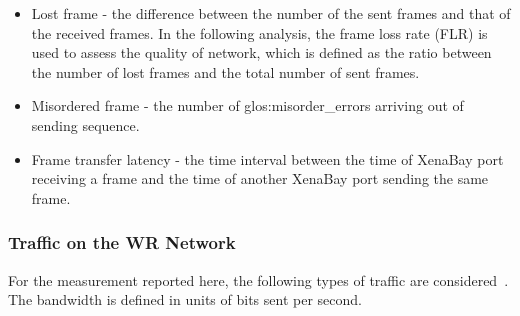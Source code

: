 \begin{itemize}
    \item Lost frame - the difference between the number of the sent frames and that of the received frames. In the following analysis, the frame loss rate (\gls{FLR}) is used to assess the quality of network, which is defined as the ratio between the number of lost frames and the total number of sent frames. 

    \item Misordered frame - the number of \gls{glos:misorder_error}s arriving out of sending sequence.
	\item Frame transfer latency - the time interval between the time of XenaBay port receiving a frame and the time of another XenaBay port sending the same frame.
\end{itemize}


\subsubsection{Traffic on the WR Network} 
For the measurement reported here, the following types of traffic are considered~\cite{prados_testing_2016}. The bandwidth is defined in units of bits sent per second. 

